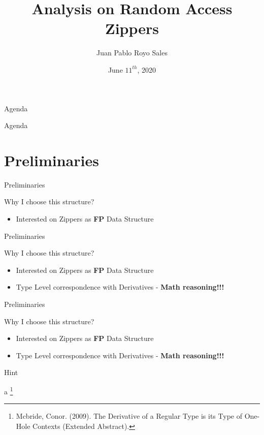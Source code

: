 \documentclass{beamer}
\title{Analysis on Random Access Zippers}
\author{Juan Pablo Royo Sales}
\institute{Universitat Politècnica de Catalunya}
\date{June $11^{th}$, 2020}
\begin{document}
\begin{frame}
\titlepage
\end{frame}

\begin{frame}{Agenda}
  \tableofcontents
\end{frame}

\begin{frame}{Agenda}
  \section{Preliminaries}
  \tableofcontents[currentsection]
\end{frame}

\begin{frame}[fragile]{Preliminaries}

  \begin{block}{Why I choose this structure?}
    \begin{itemize}
      \item Interested on Zippers as \textbf{FP} Data Structure
    \end{itemize}
  \end{block}

\end{frame}

\begin{frame}[fragile]{Preliminaries}

  \begin{block}{Why I choose this structure?}
    \begin{itemize}
      \item Interested on Zippers as \textbf{FP} Data Structure
      \item Type Level correspondence with Derivatives - \textbf{Math reasoning!!!}
      \end{itemize}
  \end{block}

\end{frame}

\begin{frame}[fragile]{Preliminaries}

  \begin{block}{Why I choose this structure?}
    \begin{itemize}
      \item Interested on Zippers as \textbf{FP} Data Structure
      \item Type Level correspondence with Derivatives - \textbf{Math reasoning!!!}
      \end{itemize}
  \end{block}

  \begin{block}{Hint}


   a \footnote{Mcbride, Conor. (2009). The Derivative of a Regular Type is its Type of One-Hole Contexts (Extended Abstract).}
  \end{block}

\end{frame}
\end{document}
